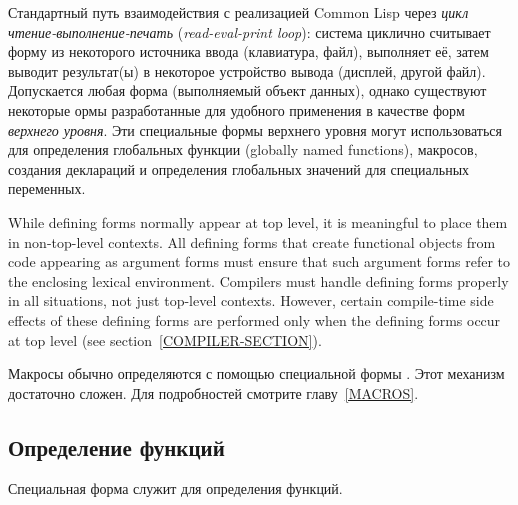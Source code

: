 Стандартный путь взаимодействия с реализацией Common Lisp через
\emph{цикл чтение-выполнение-печать} (\emph{read-eval-print loop}): система
циклично считывает форму из некоторого источника ввода (клавиатура, файл),
выполняет её, затем выводит результат(ы) в некоторое устройство вывода (дисплей,
другой файл). Допускается любая форма (выполняемый объект данных), однако
существуют некоторые ормы разработанные для удобного применения в качестве форм 
\emph{верхнего уровня}.
Эти специальные формы верхнего уровня могут использоваться для определения
глобальных функции (globally named functions), макросов, создания деклараций и
определения глобальных значений для специальных переменных.

While defining forms normally appear at top level,
it is meaningful to place them in non-top-level contexts.
All defining forms that create functional objects from code appearing
as argument forms must ensure that
such argument forms refer to the enclosing lexical environment.
Compilers must handle defining forms properly in all situations,
not just top-level contexts.  However, certain
compile-time side effects of these defining forms are performed only
when the defining forms occur at top level (see section~\ref{COMPILER-SECTION}).

Макросы обычно определяются с помощью специальной формы .
Этот механизм достаточно сложен. Для подробностей смотрите главу~\ref{MACROS}.

\subsection{Определение функций}

Специальная форма  служит для определения функций.

